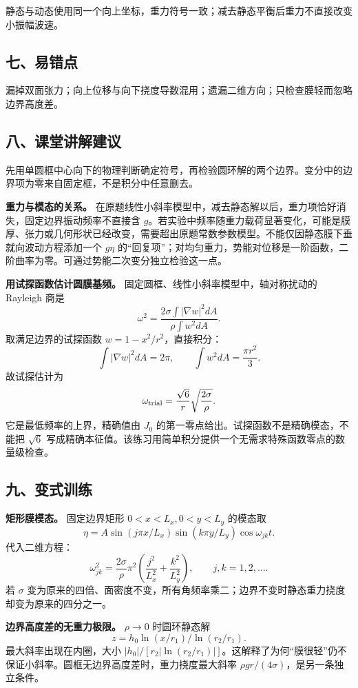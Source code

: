 \documentclass[12pt,a4paper,UTF8]{ctexart}
\begin{document}
静态与动态使用同一个向上坐标，重力符号一致；减去静态平衡后重力不直接改变小振幅波速。

\subsection{七、易错点}\label{ux4e03ux6613ux9519ux70b9-6}

漏掉双面张力；向上位移与向下挠度导数混用；遗漏二维方向；只检查膜轻而忽略边界高度差。

\subsection{八、课堂讲解建议}\label{ux516bux8bfeux5802ux8bb2ux89e3ux5efaux8bae-6}

先用单圆框中心向下的物理判断确定符号，再检验圆环解的两个边界。变分中的边界项为零来自固定框，不是积分中任意删去。

\textbf{重力与模态的关系。}
在原题线性小斜率模型中，减去静态解以后，重力项恰好消失，固定边界振动频率不直接含
\(g\)。若实验中频率随重力载荷显著变化，可能是膜厚、张力或几何形状已经改变，需要超出原题常数参数模型。不能仅因静态膜下垂就向波动方程添加一个
\(g\eta\)
的``回复项''；对均匀重力，势能对位移是一阶函数，二阶曲率为零。可通过势能二次变分独立检验这一点。

\textbf{用试探函数估计圆膜基频。}
固定圆框、线性小斜率模型中，轴对称扰动的 Rayleigh 商是 \[
\omega^2=
\frac{2\sigma\int|\nabla w|^2dA}
{\rho\int w^2dA}.
\] 取满足边界的试探函数 \(w=1-x^2/r^2\)，直接积分： \[
\int|\nabla w|^2dA=2\pi,\qquad
\int w^2dA=\frac{\pi r^2}{3}.
\] 故试探估计为 \[
\omega_{\rm trial}=\frac{\sqrt6}{r}\sqrt{\frac{2\sigma}{\rho}}.
\] 它是最低频率的上界，精确值由 \(J_0\)
的第一零点给出。试探函数不是精确模态，不能把 \(\sqrt6\)
写成精确本征值。该练习用简单积分提供一个无需求特殊函数零点的数量级检查。

\subsection{九、变式训练}\label{ux4e5dux53d8ux5f0fux8badux7ec3-6}

\textbf{矩形膜模态。} 固定边界矩形 \(0<x<L_x,0<y<L_y\) 的模态取 \[
\eta=A\sin(j\pi x/L_x)\sin(k\pi y/L_y)\cos\omega_{jk}t.
\] 代入二维方程： \[
\boxed{\omega_{jk}^2=\frac{2\sigma}{\rho}\pi^2
\left(\frac{j^2}{L_x^2}+\frac{k^2}{L_y^2}\right)},\qquad j,k=1,2,\ldots.
\] 若 \(\sigma\)
变为原来的四倍、面密度不变，所有角频率乘二；边界不变时静态重力挠度却变为原来的四分之一。

\textbf{边界高度差的无重力极限。} \(\rho\to0\) 时圆环静态解 \[
z=h_0\ln(x/r_1)/\ln(r_2/r_1).
\] 最大斜率出现在内圈，大小
\(|h_0|/[r_2|\ln(r_2/r_1)|]\)。这解释了为何``膜很轻''仍不保证小斜率。圆框无边界高度差时，重力挠度最大斜率
\(\rho gr/(4\sigma)\)，是另一条独立条件。
\end{document}
